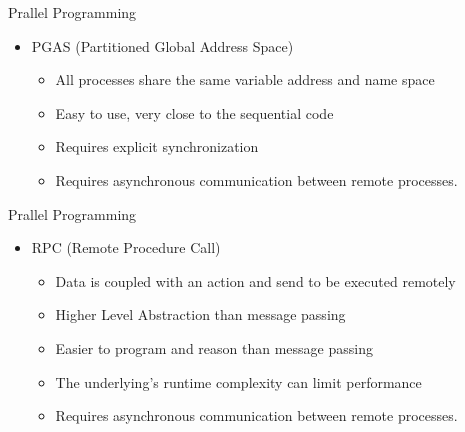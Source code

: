 \documentclass[svgnames]{beamer}
\begin{document}
\begin{frame}{Prallel Programming}
\begin{itemize}
	\item PGAS (Partitioned Global Address Space)
	\begin{itemize}
		\item All processes share the same variable address and name space
		\item Easy to use, very close to the sequential code
		\item Requires explicit synchronization 
		\item Requires asynchronous communication between remote processes.
		
	\end{itemize}
\end{itemize}
\end{frame}
\begin{frame}{Prallel Programming}
\begin{itemize}
	\item RPC (Remote Procedure Call)
	\begin{itemize}
		\item Data is coupled with an action and send to be executed remotely
		\item Higher Level Abstraction than message passing
		\item Easier to program and reason than message passing
		\item The underlying's runtime complexity can limit performance
		\item Requires asynchronous communication between remote processes.
	\end{itemize}
\end{itemize}
\end{frame}
\end{document}
